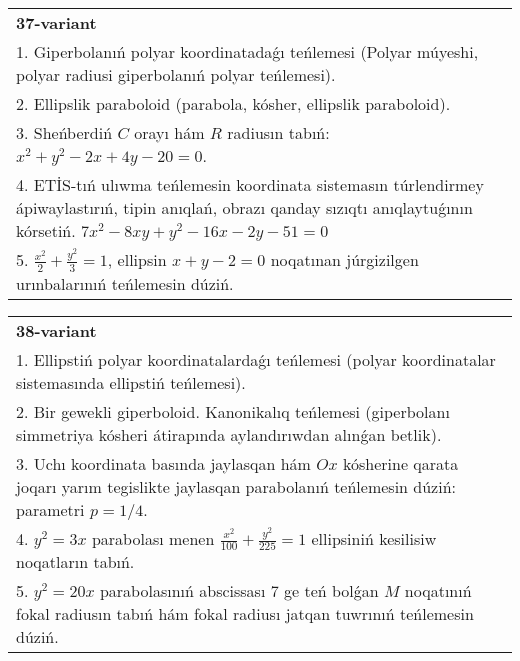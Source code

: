 \documentclass{article}
\begin{document}
\begin{tabular}{m{17cm}}
\textbf{37-variant}\\
1. Giperbolanıń polyar koordinatadaǵı teńlemesi (Polyar múyeshi, polyar radiusi giperbolanıń polyar teńlemesi).\\

2. Ellipslik paraboloid (parabola, kósher, ellipslik paraboloid).\\

3. Sheńberdiń $C$ orayı hám $R$ radiusın tabıń: $x^2+y^2-2 x+4 y-20=0$.\\

4. ETİS-tıń ulıwma teńlemesin koordinata sistemasın túrlendirmey ápiwaylastırıń, tipin anıqlań, obrazı qanday sızıqtı anıqlaytuǵının kórsetiń. $7x^{2} - 8xy + y^{2} - 16x - 2y - 51 = 0$  \\

5. $\frac{x^{2}}{2} + \frac{y^{2}}{3} = 1$, ellipsin $x + y - 2 = 0$ noqatınan júrgizilgen urınbalarınıń teńlemesin dúziń.  
\end{tabular}
\vspace{1cm}


\begin{tabular}{m{17cm}}
\textbf{38-variant}\\
1. Ellipstiń polyar koordinatalardaǵı teńlemesi (polyar koordinatalar sistemasında ellipstiń teńlemesi).\\

2. Bir gewekli giperboloid. Kanonikalıq teńlemesi (giperbolanı simmetriya kósheri átirapında aylandırıwdan alınǵan betlik).\\

3. Uchı koordinata basında jaylasqan hám $Ox$ kósherine qarata joqarı yarım tegislikte jaylasqan parabolanıń teńlemesin dúziń: parametri $p=1/4$.\\

4. $y^{2} = 3x$ parabolası menen $\frac{x^{2}}{100} + \frac{y^{2}}{225} = 1$ ellipsiniń kesilisiw noqatların tabıń.  \\

5. $y^{2} = 20x$ parabolasınıń abscissası 7 ge teń bolǵan $M$ noqatınıń fokal radiusın tabıń hám fokal radiusı jatqan tuwrınıń teńlemesin dúziń.  
\end{tabular}
\vspace{1cm}
\end{document}
